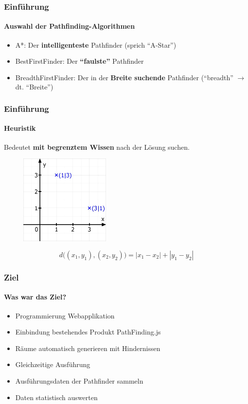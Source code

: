 \documentclass[professionalfont,serif,german]{beamer}
\begin{document}
\begin{frame}
  \frametitle{Einführung}
  \framesubtitle{Auswahl der Pathfinding-Algorithmen}
  \begin{itemize}
    \item \textcolor{pfblue}{A*}: Der \textbf{intelligenteste} Pathfinder (sprich ``A-Star'')
    \item \textcolor{pfred}{BestFirstFinder}: Der \textbf{``faulste''} Pathfinder
    \item \textcolor{pfgreen}{BreadthFirstFinder}: Der in der \textbf{Breite suchende} Pathfinder (``breadth'' $\rightarrow$ dt. ``Breite'')
  \end{itemize}
\end{frame}

\begin{frame}
  \frametitle{Einführung}
  \framesubtitle{Heuristik}
  Bedeutet \textbf{mit begrenztem Wissen} nach der Lösung suchen.
  \begin{figure}
    \centering
    \includegraphics[height=4.5cm]{img/mathegrafix.jpg}
  \end{figure}
  \begin{equation*}
    d\big((x_1,y_1),(x_2,y_2)\big) = |x_1 - x_{2}| + |y_{1} - y_{2}|
  \end{equation*}
\end{frame}

\begin{frame}
  \frametitle{Ziel}
  \framesubtitle{Was war das Ziel?}
  \begin{itemize}
    \item Programmierung Webapplikation
    \item Einbindung bestehendes Produkt PathFinding.js
    \item Räume automatisch generieren mit Hindernissen
    \item Gleichzeitige Ausführung
    \item Ausführungsdaten der Pathfinder sammeln
    \item Daten statistisch auswerten
  \end{itemize}
\end{frame}
\end{document}
